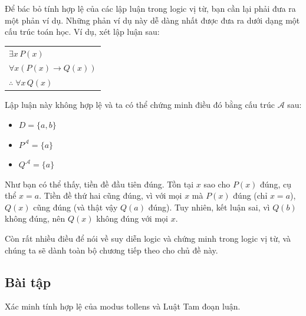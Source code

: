 Để bác bỏ tính hợp lệ của các lập luận trong logic vị từ, bạn cần lại phải đưa ra một phản ví dụ. Những phản ví dụ này dễ dàng nhất được đưa ra dưới dạng một cấu trúc toán học. Ví dụ, xét lập luận sau:
\begin{center}
\begin{tabular}{l}
$\exists x\, P(x)$ \\
$\forall x(P(x) \to Q(x))$ \\
\hline
$\therefore\; \forall x\, Q(x)$
\end{tabular}
\end{center}
Lập luận này không hợp lệ và ta có thể chứng minh điều đó bằng cấu trúc $\mathcal{A}$ sau:
\begin{itemize}
\item $D = \{a, b\}$
\item $P^{\mathcal{A}} = \{a\}$
\item $Q^{\mathcal{A}} = \{a\}$
\end{itemize}
Như bạn có thể thấy, tiền đề đầu tiên đúng. Tồn tại $x$ sao cho $P(x)$ đúng, cụ thể $x = a$. Tiền đề thứ hai cũng đúng, vì với mọi $x$ mà $P(x)$ đúng (chỉ $x = a$), $Q(x)$ cũng đúng (và thật vậy $Q(a)$ đúng). Tuy nhiên, kết luận sai, vì $Q(b)$ không đúng, nên $Q(x)$ không đúng với mọi $x$.

Còn rất nhiều điều để nói về suy diễn logic và chứng minh trong logic vị từ, và chúng ta sẽ dành toàn bộ chương tiếp theo cho chủ đề này.

\subsection*{Bài tập}

\begin{exercise}
Xác minh tính hợp lệ của modus tollens và Luật Tam đoạn luận.
\end{exercise}

